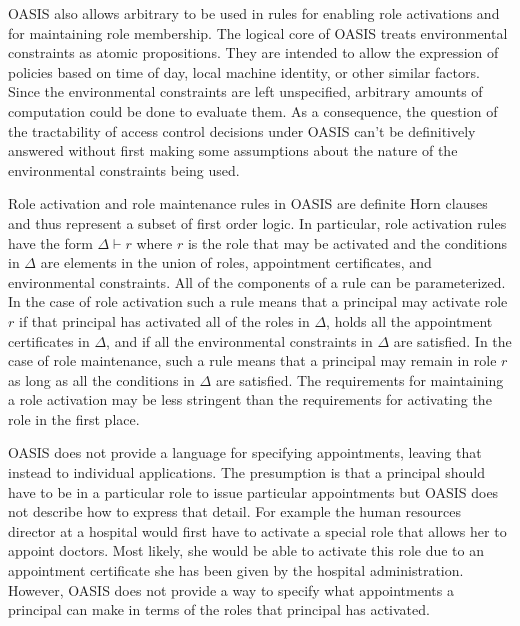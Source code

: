 OASIS also allows arbitrary  to be
used in rules for enabling role activations and for maintaining role
membership. The logical core of OASIS treats environmental constraints
as atomic propositions.  They are intended to allow the expression of
policies based on time of day, local machine identity, or other
similar factors. Since the environmental constraints are left
unspecified, arbitrary amounts of computation could be done to
evaluate them. As a consequence, the question of the tractability of
access control decisions under OASIS can't be definitively answered
without first making some assumptions about the nature of the
environmental constraints being used.

Role activation and role maintenance rules in OASIS are definite Horn
clauses and thus represent a subset of first order logic. In particular,
role activation rules have the form $\Delta \vdash r$ where $r$ is the role
that may be activated and the conditions in $\Delta$ are elements in the
union of roles, appointment certificates, and environmental constraints.
All of the components of a rule can be parameterized. In the case of role
activation such a rule means that a principal may activate role $r$ if that
principal has activated all of the roles in $\Delta$, holds all the
appointment certificates in $\Delta$, and if all the environmental
constraints in $\Delta$ are satisfied. In the case of role maintenance,
such a rule means that a principal may remain in role $r$ as long as all
the conditions in $\Delta$ are satisfied. The requirements for maintaining
a role activation may be less stringent than the requirements for
activating the role in the first place.

OASIS does not provide a language for specifying appointments, leaving that
instead to individual applications. The presumption is that a principal
should have to be in a particular role to issue particular appointments but
OASIS does not describe how to express that detail. For example the human
resources director at a hospital would first have to activate a special
role that allows her to appoint doctors. Most likely, she would be able to
activate this role due to an appointment certificate she has been given by
the hospital administration. However, OASIS does not provide a way to
specify what appointments a principal can make in terms of the roles that
principal has activated.

